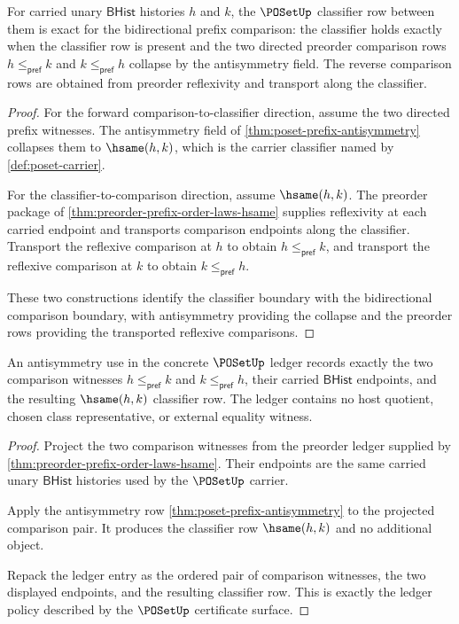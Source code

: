 \begin{theorem}
\label{thm:poset-classifier-exactness-obligation}
For carried unary $\mathsf{BHist}$ histories $h$ and $k$, the $\POSetUp$
classifier row between them is exact for the bidirectional prefix comparison:
the classifier holds exactly when the classifier row is present and the two
directed preorder comparison rows $h\le_{\mathsf{pref}}k$ and
$k\le_{\mathsf{pref}}h$ collapse by the antisymmetry field.  The reverse
comparison rows are obtained from preorder reflexivity and transport along the
classifier.
\end{theorem}
\begin{proof}
For the forward comparison-to-classifier direction, assume the two directed
prefix witnesses.  The antisymmetry field of
\autoref{thm:poset-prefix-antisymmetry} collapses them to $\hsame(h,k)$, which
is the carrier classifier named by \autoref{def:poset-carrier}.

For the classifier-to-comparison direction, assume $\hsame(h,k)$.  The
preorder package of \autoref{thm:preorder-prefix-order-laws-hsame} supplies
reflexivity at each carried endpoint and transports comparison endpoints along
the classifier.  Transport the reflexive comparison at $h$ to obtain
$h\le_{\mathsf{pref}}k$, and transport the reflexive comparison at $k$ to
obtain $k\le_{\mathsf{pref}}h$.

These two constructions identify the classifier boundary with the
bidirectional comparison boundary, with antisymmetry providing the collapse
and the preorder rows providing the transported reflexive comparisons.
\end{proof}

\begin{theorem}
\label{thm:poset-ledger-antisymmetry-obligation}
An antisymmetry use in the concrete $\POSetUp$ ledger records exactly the two
comparison witnesses $h\le_{\mathsf{pref}}k$ and
$k\le_{\mathsf{pref}}h$, their carried $\mathsf{BHist}$ endpoints, and the
resulting $\hsame(h,k)$ classifier row.  The ledger contains no host quotient,
chosen class representative, or external equality witness.
\end{theorem}
\begin{proof}
Project the two comparison witnesses from the preorder ledger supplied by
\autoref{thm:preorder-prefix-order-laws-hsame}.  Their endpoints are the same
carried unary $\mathsf{BHist}$ histories used by the $\POSetUp$ carrier.

Apply the antisymmetry row
\autoref{thm:poset-prefix-antisymmetry} to the projected comparison pair.  It
produces the classifier row $\hsame(h,k)$ and no additional object.

Repack the ledger entry as the ordered pair of comparison witnesses, the two
displayed endpoints, and the resulting classifier row.  This is exactly the
ledger policy described by the $\POSetUp$ certificate surface.
\end{proof}

